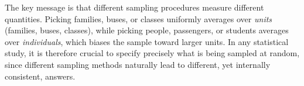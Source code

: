 The key message is that different sampling procedures measure different quantities.  
Picking families, buses, or classes uniformly averages over \textit{units} (families, buses, classes), while picking people, passengers, or students averages over \textit{individuals}, which biases the sample toward larger units.  
In any statistical study, it is therefore crucial to specify precisely what is being sampled at random, since different sampling methods naturally lead to different, yet internally consistent, answers.